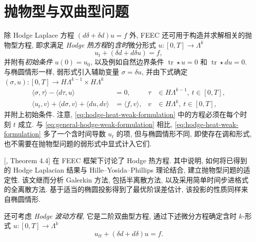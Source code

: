 \section{{抛物型与双曲型问题}}\label{sec:parabolic-hyperbolic}

{除 Hodge Laplace 方程 $(d\delta+\delta d)u=f$ 外, FEEC 还可用于构造并求解相关的抛物型方程, 即求满足 \emph{Hodge 热方程}的\emph{含时}微分形式 $u:[0,T]\to\Lambda^k$}
\begin{equation}\label{eq:hodge-heat-equation}
u_t+(\delta d+d\delta u)=f,
\end{equation}
{并附有\emph{初始条件} $u(0)=u_0$, 以及例如自然边界条件 $\operatorname{tr}\star u=0$ 和 $\operatorname{tr}\star du=0$. 与椭圆情形一样, 弱形式引入辅助变量 $\sigma=\delta u$, 并由下式确定 $(\sigma,u):[0,T]\to H\Lambda^{k-1}\times H\Lambda^k$}
\begin{equation}\label{eq:hodge-heat-weak-formulation}
\begin{aligned}
\langle\sigma,\tau\rangle-\langle d\tau,u\rangle&=0,&\tau&\in H\Lambda^{k-1},\ t\in[0,T],\\
\langle u_t,v\rangle+\langle d\sigma,v\rangle+\langle du,dv\rangle&=\langle f,v\rangle,&v&\in H\Lambda^k,\ t\in[0,T],
\end{aligned}
\end{equation}
{并附上初始条件. 注意, \eqref{eq:hodge-heat-weak-formulation} 中的方程必须在每个时刻 $t$ 成立. 与 \eqref{eq:general-hodge-weak-formulation} 相比, \eqref{eq:hodge-heat-weak-formulation} 多了一个含时间导数 $u_t$ 的项, 但与椭圆情形不同, 即使存在调和形式, 也不需要在抛物型问题的弱形式中显式计入它们.}

{[, Theorem 4.4] 在 FEEC 框架下讨论了 Hodge 热方程. 其中说明, 如何将已得到的 Hodge Laplacian 结果与 Hille–Yosida–Phillips 理论结合, 建立抛物型问题的适定性. 该文继而分析 Galerkin 方法, 包括半离散方法, 以及采用简单时间步进格式的全离散方法. 基于适当的椭圆投影得到了最优阶误差估计, 该投影的性质同样来自椭圆情形.}

{还可考虑 \emph{Hodge 波动方程}, 它是二阶双曲型方程, 通过下述微分方程确定含时 $k$-形式 $u:[0,T]\to\Lambda^k$}
\begin{equation}\label{eq:hodge-wave-equation}
u_{tt}+(\delta d+d\delta)u=f.
\end{equation}


